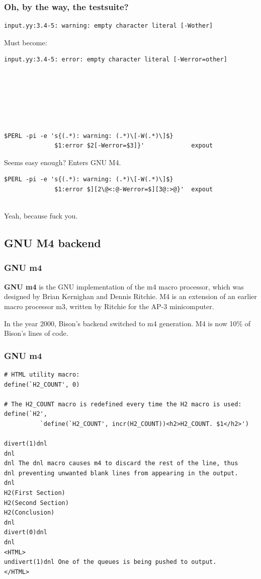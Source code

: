 \documentclass{beamer}
\begin{document}
\begin{frame}[fragile,shrink=25]
  \frametitle{Oh, by the way, the testsuite?}
\begin{verbatim}
input.yy:3.4-5: warning: empty character literal [-Wother]
\end{verbatim}

Must become:

\begin{verbatim}
input.yy:3.4-5: error: empty character literal [-Werror=other]
\end{verbatim}

\pause

\begin{verbatim}






$PERL -pi -e 's{(.*): warning: (.*)\[-W(.*)\]$}
              $1:error $2[-Werror=$3]}'             expout
\end{verbatim}

Seems easy enough?  \pause Enters GNU M4.

\begin{verbatim}
$PERL -pi -e 's{(.*): warning: (.*)\[-W(.*)\]$}
              $1:error $][2\@<:@-Werror=$][3@:>@}'  expout


\end{verbatim}

Yeah, because fuck you.
\end{frame}

\subsection{GNU M4 backend}

\begin{frame}
  \frametitle{GNU m4}
  \textbf{GNU m4} is the GNU implementation of the m4 macro processor, which
  was designed by Brian Kernighan and Dennis Ritchie. M4 is an extension of an
  earlier macro processor m3, written by Ritchie for the AP-3 minicomputer.

\vfill

  In the year 2000, Bison's backend switched to m4 generation. M4 is now 10\%
  of Bison's lines of code.
\end{frame}

\begin{frame}[fragile,shrink=25]
  \frametitle{GNU m4}
  \begin{verbatim}
# HTML utility macro:
define(`H2_COUNT', 0)

# The H2_COUNT macro is redefined every time the H2 macro is used:
define(`H2',
          `define(`H2_COUNT', incr(H2_COUNT))<h2>H2_COUNT. $1</h2>')

divert(1)dnl
dnl
dnl The dnl macro causes m4 to discard the rest of the line, thus
dnl preventing unwanted blank lines from appearing in the output.
dnl
H2(First Section)
H2(Second Section)
H2(Conclusion)
dnl
divert(0)dnl
dnl
<HTML>
undivert(1)dnl One of the queues is being pushed to output.
</HTML>
  \end{verbatim}
\end{frame}
\end{document}
